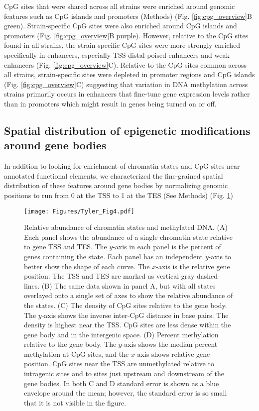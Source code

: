 \documentclass[
  11pt,
]{article}
\begin{document}
CpG sites that were shared across all strains were enriched around
genomic features such as CpG islands and promoters (Methods) (Fig.
\ref{fig:cpg_overview}B green). Strain-specific CpG sites were also
enriched around CpG islands and promoters (Fig. \ref{fig:cpg_overview}B
purple). However, relative to the CpG sites found in all strains, the
strain-specific CpG sites were more strongly enriched specifically in
enhancers, especially TSS-distal poised enhancers and weak enhancers
(Fig. \ref{fig:cpg_overview}C). Relative to the CpG sites common across
all strains, strain-specific sites were depleted in promoter regions and
CpG islands (Fig. \ref{fig:cpg_overview}C) suggesting that variation in
DNA methylation across strains primarily occurs in enhancers that
fine-tune gene expression levels rather than in promoters which might
result in genes being turned on or off.

\hypertarget{spatial-distribution-of-epigenetic-modifications-around-gene-bodies}{%
\subsection{Spatial distribution of epigenetic modifications around gene
bodies}\label{spatial-distribution-of-epigenetic-modifications-around-gene-bodies}}

In addition to looking for enrichment of chromatin states and CpG sites
near annotated functional elements, we characterized the fine-grained
spatial distribution of these features around gene bodies by normalizing
genomic positions to run from 0 at the TSS to 1 at the TES (See Methods)
(Fig. \ref{fig:state_abundance})

\begin{figure}[ht!]
\texttt{[image: Figures/Tyler\_Fig4.pdf]} 
\caption{Relative abundance of chromatin states and methylated DNA. (A) Each panel 
shows the abundance of a single chromatin state relative to gene TSS and TES. The 
$y$-axis in each panel is the percent of genes containing the state. Each
panel has an independent $y$-axis to better show the shape of each curve.
The $x$-axis is the relative gene position. The TSS and TES are marked as vertical
gray dashed lines. (B) The same data shown in panel A, but with all states overlayed
onto a single set of axes to show the relative abundance of the states. 
(C) The density of CpG sites relative to the gene body. The $y$-axis shows 
the inverse inter-CpG distance in base pairs. The density is highest near the 
TSS. CpG sites are less dense within the gene body and in the intergenic space. 
(D) Percent methylation relative to the gene body. The $y$-axis shows the median 
percent methylation at CpG sites, and the $x$-axis shows relative gene position. 
CpG sites near the TSS are unmethylated relative to intragenic sites and to sites
just upstream and downstream of the gene bodies. In both C and D standard error 
is shown as a blue envelope around the mean; however, the standard error is so 
small that it is not visible in the figure.}
\label{fig:state_abundance}
\end{figure}
\end{document}
